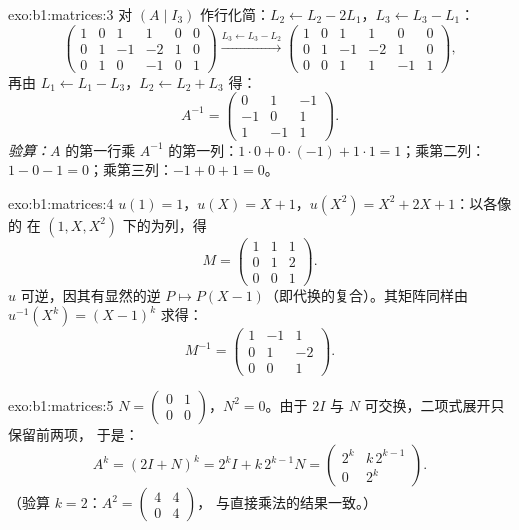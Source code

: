 \begin{solution}{exo:b1:matrices:3}
对 $(A \mid I_3)$ 作行化简：$L_2 \leftarrow L_2 - 2L_1$，$L_3
\leftarrow L_3 - L_1$：
\[
\begin{pmatrix}
1 & 0 & 1 & 1 & 0 & 0\\
0 & 1 & -1 & -2 & 1 & 0\\
0 & 1 & 0 & -1 & 0 & 1
\end{pmatrix}
\xrightarrow{L_3 \leftarrow L_3 - L_2}
\begin{pmatrix}
1 & 0 & 1 & 1 & 0 & 0\\
0 & 1 & -1 & -2 & 1 & 0\\
0 & 0 & 1 & 1 & -1 & 1
\end{pmatrix},
\]
再由 $L_1 \leftarrow L_1 - L_3$，$L_2 \leftarrow L_2 + L_3$ 得：
\[
A^{-1} = \begin{pmatrix}
0 & 1 & -1\\
-1 & 0 & 1\\
1 & -1 & 1
\end{pmatrix}.
\]
\emph{验算：}$A$ 的第一行乘 $A^{-1}$ 的第一列：$1
\cdot 0 + 0\cdot(-1) + 1\cdot 1 = 1$；乘第二列：$1 - 0 -
1 = 0$；乘第三列：$-1 + 0 + 1 = 0$。
\end{solution}

\begin{solution}{exo:b1:matrices:4}
$u(1) = 1$，$u(X) = X + 1$，$u(X^2) = X^2 + 2X + 1$：以各像的
在 $(1, X, X^2)$ 下的为列，得
\[
M = \begin{pmatrix}
1 & 1 & 1\\
0 & 1 & 2\\
0 & 0 & 1
\end{pmatrix}.
\]
$u$ 可逆，因其有显然的逆 $P \mapsto P(X
- 1)$（即代换的复合）。其矩阵同样由
$u^{-1}(X^k) = (X-1)^k$ 求得：
\[
M^{-1} = \begin{pmatrix}
1 & -1 & 1\\
0 & 1 & -2\\
0 & 0 & 1
\end{pmatrix}.
\]
\end{solution}

\begin{solution}{exo:b1:matrices:5}
$N = \begin{pmatrix} 0 & 1\\ 0 & 0\end{pmatrix}$，$N^2 = 0$。由于
$2I$ 与 $N$ 可交换，二项式展开只保留前两项，
于是：
\[
A^k = (2I + N)^k = 2^k I + k\,2^{k-1} N
= \begin{pmatrix} 2^k & k\,2^{k-1}\\ 0 & 2^k\end{pmatrix}.
\]
（验算 $k = 2$：$A^2 = \begin{pmatrix}4 & 4\\ 0 & 4\end{pmatrix}$，
与直接乘法的结果一致。）
\end{solution}

